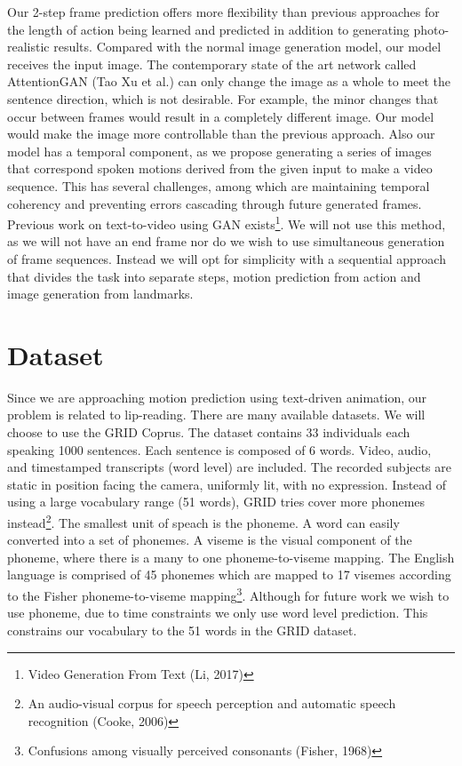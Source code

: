 \documentclass[10pt,twocolumn,letterpaper]{article}
\begin{document}
 Our 2-step frame prediction offers more flexibility than previous approaches for the length of action being learned and predicted in addition to generating photo-realistic results. Compared with the normal image generation model, our model receives the input image. The contemporary state of the art network called AttentionGAN (Tao Xu et al.) can only change the image as a whole to meet the sentence direction, which is not desirable. For example, the minor changes that occur between frames would result in a completely different image. Our model would make the image more controllable than the previous approach. Also our model has a temporal component, as we propose generating a series of images that correspond spoken motions derived from the given input to make a video sequence. This has several challenges, among which are maintaining temporal coherency and preventing errors cascading through future generated frames. Previous work on text-to-video using GAN exists\footnote{Video Generation From Text (Li, 2017)}. We will not use this method, as we will not have an end frame nor do we wish to use simultaneous generation of frame sequences. Instead we will opt for simplicity with a sequential approach that divides the task into separate steps, motion prediction from action and image generation from landmarks.


\section{Dataset}
 Since we are approaching motion prediction using text-driven animation, our problem is related to lip-reading. There are many available datasets. We will choose to use the GRID Coprus. The dataset contains 33 individuals each speaking 1000 sentences. Each sentence is composed of 6 words. Video, audio, and timestamped transcripts (word level) are included. The recorded subjects are static in position facing the camera, uniformly lit, with no expression. Instead of using a large vocabulary range (51 words), GRID tries cover more phonemes instead\footnote{An audio-visual corpus for speech perception and automatic speech recognition (Cooke, 2006)}. The smallest unit of speach is the phoneme. A word can easily converted into a set of phonemes. A viseme is the visual component  of the phoneme, where there is a many to one phoneme-to-viseme mapping. The English language is comprised of 45 phonemes which are mapped to 17 visemes according to the Fisher phoneme-to-viseme mapping\footnote{Confusions among visually perceived consonants (Fisher, 1968)}. Although for future work we wish to use phoneme, due to time constraints we only use word level prediction. This constrains our vocabulary to the 51 words in the GRID dataset.
\end{document}
